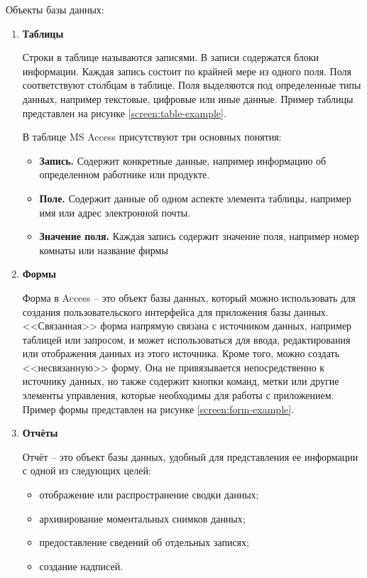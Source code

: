Объекты базы данных:
\begin{enumerate}
    \item \textbf{Таблицы}
    
    \tab Строки в таблице называются записями. В записи содержатся блоки информации. Каждая запись состоит по крайней мере из одного поля. Поля соответствуют столбцам в таблице. Поля выделяются под определенные типы данных, например текстовые, цифровые или иные данные. Пример таблицы представлен на рисунке \ref{screen:table-example}.

    \tab В таблице MS Access присутствуют три основных понятия:
    \begin{itemize}
        \item \textbf{Запись.} Содержит конкретные данные, например информацию об определенном работнике или продукте.
        \item \textbf{Поле.} Содержит данные об одном аспекте элемента таблицы, например имя или адрес электронной почты.
        \item \textbf{Значение поля.} Каждая запись содержит значение поля, например номер комнаты или название фирмы
    \end{itemize}


    \item \textbf{Формы}
    
    \tab Форма в Access -- это объект базы данных, который можно использовать для создания пользовательского интерфейса для приложения базы данных. <<Связанная>> форма напрямую связана с источником данных, например таблицей или запросом, и может использоваться для ввода, редактирования или отображения данных из этого источника. Кроме того, можно создать <<несвязанную>> форму. Она не привязывается непосредственно к источнику данных, но также содержит кнопки команд, метки или другие элементы управления, которые необходимы для работы с приложением. Пример формы представлен на рисунке \ref{screen:form-example}.


    \item \textbf{Отчёты}
    
    \tab Отчёт -- это объект базы данных, удобный для представления ее информации с одной из следующих целей:
    \begin{itemize}
        \item отображение или распространение сводки данных;
        \item архивирование моментальных снимков данных;
        \item предоставление сведений об отдельных записях;
        \item создание надписей.
    \end{itemize}


\end{enumerate}
